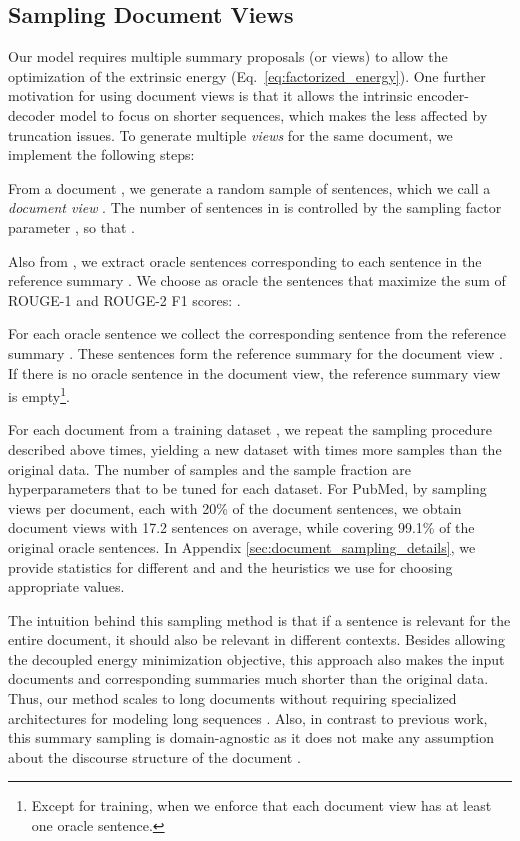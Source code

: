 \documentclass[11pt,table]{article}
\newenvironment{itemizesquish}[2]{\begin{list}{\labelitemi}{\setlength{\itemsep}{#1}\setlength{\labelwidth}{#2}\setlength{\leftmargin}{\labelwidth}\addtolength{\leftmargin}{\labelsep}}}{\end{list}}
\begin{document}
\subsection{Sampling Document Views}
\label{sec:sampling_document_views}
Our model requires multiple summary proposals (or views) to allow the optimization of the extrinsic energy (Eq.~\ref{eq:factorized_energy}). One further motivation for using document views is that it allows the intrinsic encoder-decoder model to focus on shorter sequences, which makes the less affected by truncation issues. To generate multiple \emph{views} for the same document, we implement the following steps:
\begin{itemizesquish}{-0.3em}{0.5em}
    \item From a document , we generate a random sample of sentences, which we call a \emph{document view} . The number of sentences in  is controlled by the sampling factor parameter , so that .
    \item Also from , we extract oracle sentences  corresponding to each sentence  in the reference summary . We choose as oracle the sentences that maximize the sum of ROUGE-1 and ROUGE-2 F1 scores: .
    \item For each oracle sentence  we collect the corresponding sentence  from the reference summary . These sentences  form the reference summary  for the document view . If there is no oracle sentence in the document view, the reference summary view  is empty\footnote{Except for training, when we enforce that each document view has at least one oracle sentence.}.
\end{itemizesquish}
For each document  from a training dataset , we repeat the sampling procedure described above  times, yielding a new dataset  with  times more samples than the original data. The number of samples  and the sample fraction  are hyperparameters that to be tuned for each dataset. For PubMed, by sampling  views per document, each with 20\% of the document sentences, we obtain document views with 17.2 sentences on average, while covering 99.1\% of the original oracle sentences. In Appendix \ref{sec:document_sampling_details}, we provide statistics for different  and  and the heuristics we use for choosing appropriate values.

The intuition behind this sampling method is that if a sentence is relevant for the entire document, it should also be relevant in different contexts. Besides allowing the decoupled energy minimization objective, this approach also makes the input documents and corresponding summaries much shorter than the original data. Thus, our method scales to long documents without requiring specialized architectures for modeling long sequences \citep{beltagy2020longformer, zaheer2020big}. Also, in contrast to previous work, this summary sampling is domain-agnostic as it does not make any assumption about the discourse structure of the document \citep{dong-etal-2021-discourse, gidiotis2020divide}.
\end{document}

